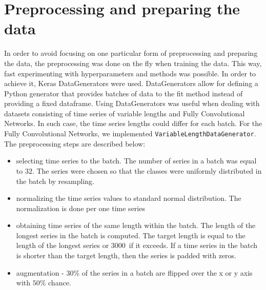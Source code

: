 \documentclass[a4paper,11pt,twoside]{report}
\theoremstyle{definition}
\begin{document}
\section{Preprocessing and preparing the data}\label{section:preprocessing}
 In order to avoid focusing on one particular form of preprocessing and preparing the data, the preprocessing was done on the fly when training the data. This way, fast experimenting with hyperparameters and methods was possible. In order to achieve it, Keras DataGenerators were used. DataGenerators allow for defining a Python generator that provides batches of data to the fit method instead of providing a fixed dataframe. Using DataGenerators was useful when dealing with datasets consisting of time series of variable lengths and Fully Convolutional Networks. In such case, the time series lengths could differ for each batch.
For the Fully Convolutional Networks, we implemented \texttt{VariableLengthDataGenerator}.
The preprocessing steps are described below:
\begin{itemize}
   \item selecting time series to the batch. The number of series in a batch was equal to $32$. The series were chosen so that the classes were uniformly distributed in the batch by resampling.
   \item normalizing the time series values to standard normal distribution. The normalization is done per one time series
   \item obtaining time series of the same length within the batch. The length of the longest series in the batch is computed. The target length is equal to the length of the longest series or $3000$~if it exceeds. If a time series in the batch is shorter than the target length, then the series is padded with zeros.

\item augmentation - $30\%$ of the series in a batch are flipped over the x or y axis with $50\%$ chance.

\end{itemize}
\end{document}
